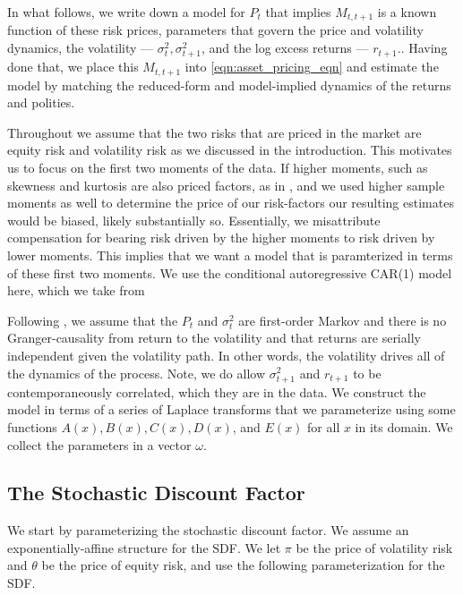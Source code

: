 \documentclass[11pt, letterpaper, twoside, final]{article}
\begin{document}
In what follows, we write down a model for $P_t$ that implies $M_{t,t+1}$ is a known function of these risk
prices, parameters that govern the price and volatility dynamics, the volatility --- $\sigma^2_{t},
\sigma^2_{t+1}$, and the log excess returns --- $r_{t+1}$..
Having done that, we place this $M_{t,t+1}$ into \cref{eqn:asset_pricing_eqn} and estimate the model by matching
the reduced-form and model-implied dynamics of the returns and polities.

Throughout we assume that the two risks that are priced in the market are equity risk and volatility risk as we
discussed in the introduction.
This motivates us to focus on the first two moments of the data.
If higher moments, such as skewness and kurtosis are also priced factors, as in \textcites{harvey2000conditional,
conrad2012exante, chang2013market},  and we used higher sample moments as well to determine the price of our
risk-factors our resulting estimates would be biased, likely substantially so. 
Essentially, we misattribute compensation for bearing risk driven by the higher moments to risk driven by lower
moments.
This implies that we want a model that is paramterized in terms of these first two moments.
We use the conditional autoregressive CAR(1) model here, which we take from
\textcite{darolles2006structural,khrapov2016affine}

Following \textcite{khrapov2016affine}, we assume that the $P_t$ and $\sigma^2_t$  are first-order Markov and
there is no Granger-causality from return to the volatility and that returns are serially independent given the
volatility path.
In other words, the volatility drives all of the dynamics of the process.
Note, we do allow $\sigma^2_{t+1}$ and $r_{t+1}$ to be contemporaneously correlated, which they are in the data. 
We construct the model in terms of a series of Laplace transforms that we parameterize using some functions $A(x),
B(x), C(x), D(x)$, and $E(x)$ for all $x$ in its domain.
We collect the parameters in a vector $\omega$.

\subsection{The Stochastic Discount Factor}\label{sec:deriving_sdf_functions}

We start by parameterizing the stochastic discount factor. 
We assume an exponentially-affine structure for the SDF.
We let $\pi$ be the price of volatility risk and $\theta$ be the price of equity risk, and use the following
parameterization for  the SDF.
\end{document}
